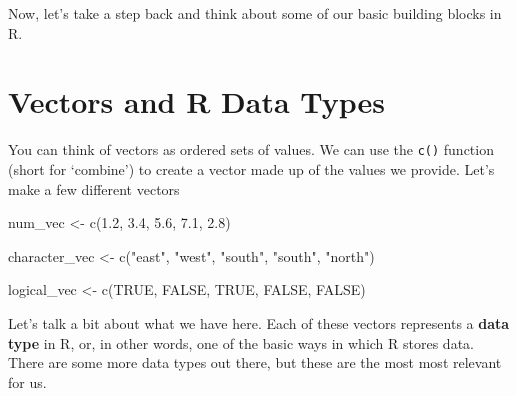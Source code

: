 \documentclass[
  letterpaper,
  DIV=11,
  numbers=noendperiod]{scrreprt}
\newenvironment{Shaded}{\begin{snugshade}}{\end{snugshade}}
\newcommand{\ConstantTok}[1]{\textcolor[rgb]{0.56,0.35,0.01}{#1}}
\newcommand{\FloatTok}[1]{\textcolor[rgb]{0.68,0.00,0.00}{#1}}
\newcommand{\FunctionTok}[1]{\textcolor[rgb]{0.28,0.35,0.67}{#1}}
\newcommand{\NormalTok}[1]{\textcolor[rgb]{0.00,0.23,0.31}{#1}}
\newcommand{\OtherTok}[1]{\textcolor[rgb]{0.00,0.23,0.31}{#1}}
\newcommand{\StringTok}[1]{\textcolor[rgb]{0.13,0.47,0.30}{#1}}
\begin{document}
Now, let's take a step back and think about some of our basic building
blocks in R.

\section{Vectors and R Data Types}\label{vectors-and-r-data-types}

You can think of vectors as ordered sets of values. We can use the
\texttt{c()} function (short for `combine') to create a vector made up
of the values we provide. Let's make a few different vectors

\begin{Shaded}
\begin{Highlighting}[]
\NormalTok{num\_vec }\OtherTok{\textless{}{-}} \FunctionTok{c}\NormalTok{(}\FloatTok{1.2}\NormalTok{, }\FloatTok{3.4}\NormalTok{, }\FloatTok{5.6}\NormalTok{, }\FloatTok{7.1}\NormalTok{, }\FloatTok{2.8}\NormalTok{)}

\NormalTok{character\_vec }\OtherTok{\textless{}{-}} \FunctionTok{c}\NormalTok{(}\StringTok{"east"}\NormalTok{, }\StringTok{"west"}\NormalTok{, }\StringTok{"south"}\NormalTok{, }\StringTok{"south"}\NormalTok{, }\StringTok{"north"}\NormalTok{) }

\NormalTok{logical\_vec }\OtherTok{\textless{}{-}} \FunctionTok{c}\NormalTok{(}\ConstantTok{TRUE}\NormalTok{, }\ConstantTok{FALSE}\NormalTok{, }\ConstantTok{TRUE}\NormalTok{, }\ConstantTok{FALSE}\NormalTok{, }\ConstantTok{FALSE}\NormalTok{) }
\end{Highlighting}
\end{Shaded}

Let's talk a bit about what we have here. Each of these vectors
represents a \textbf{data type} in R, or, in other words, one of the
basic ways in which R stores data. There are some more data types out
there, but these are the most most relevant for us.
\end{document}

